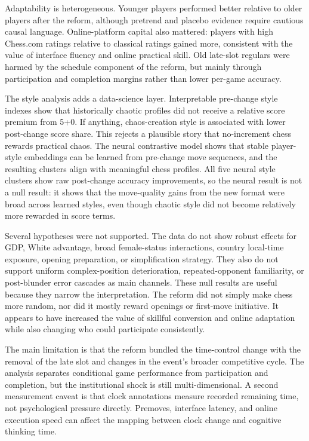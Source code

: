 Adaptability is heterogeneous. Younger players performed better relative to older players after the reform, although pretrend and placebo evidence require cautious causal language. Online-platform capital also mattered: players with high Chess.com ratings relative to classical ratings gained more, consistent with the value of interface fluency and online practical skill. Old late-slot regulars were harmed by the schedule component of the reform, but mainly through participation and completion margins rather than lower per-game accuracy.

The style analysis adds a data-science layer. Interpretable pre-change style indexes show that historically chaotic profiles did not receive a relative score premium from 5+0. If anything, chaos-creation style is associated with lower post-change score share. This rejects a plausible story that no-increment chess rewards practical chaos. The neural contrastive model shows that stable player-style embeddings can be learned from pre-change move sequences, and the resulting clusters align with meaningful chess profiles. All five neural style clusters show raw post-change accuracy improvements, so the neural result is not a null result: it shows that the move-quality gains from the new format were broad across learned styles, even though chaotic style did not become relatively more rewarded in score terms.

Several hypotheses were not supported. The data do not show robust effects for GDP, White advantage, broad female-status interactions, country local-time exposure, opening preparation, or simplification strategy. They also do not support uniform complex-position deterioration, repeated-opponent familiarity, or post-blunder error cascades as main channels. These null results are useful because they narrow the interpretation. The reform did not simply make chess more random, nor did it mostly reward openings or first-move initiative. It appears to have increased the value of skillful conversion and online adaptation while also changing who could participate consistently.

The main limitation is that the reform bundled the time-control change with the removal of the late slot and changes in the event's broader competitive cycle. The analysis separates conditional game performance from participation and completion, but the institutional shock is still multi-dimensional. A second measurement caveat is that clock annotations measure recorded remaining time, not psychological pressure directly. Premoves, interface latency, and online execution speed can affect the mapping between clock change and cognitive thinking time.

